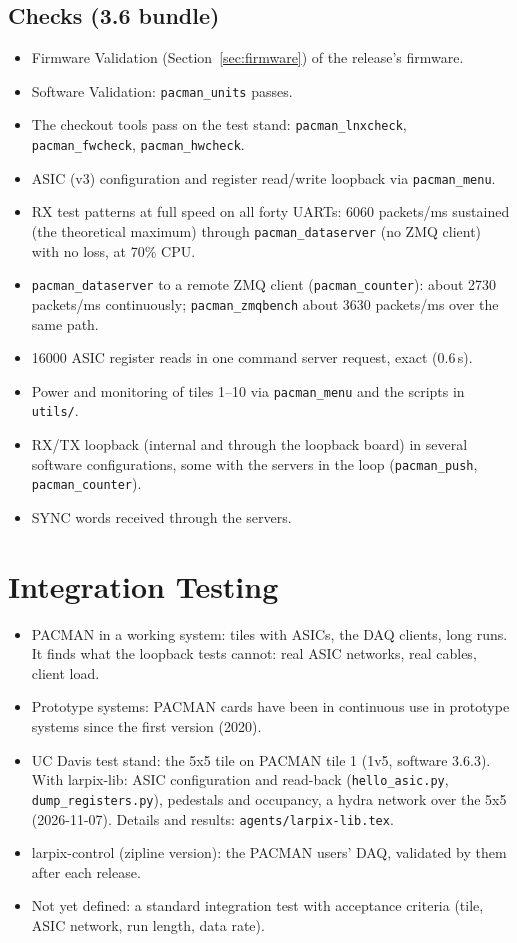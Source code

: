 \documentclass[11pt]{article}
\begin{document}
\subsection{Checks (3.6 bundle)}

\begin{itemize}
\item Firmware Validation (Section~\ref{sec:firmware}) of the release's firmware.
\item Software Validation:  \texttt{pacman\_units} passes.
\item The checkout tools pass on the test stand:  \texttt{pacman\_lnxcheck}, \texttt{pacman\_fwcheck},
  \texttt{pacman\_hwcheck}.
\item ASIC (v3) configuration and register read/write loopback via \texttt{pacman\_menu}.
\item RX test patterns at full speed on all forty UARTs:  6060 packets/ms sustained (the theoretical maximum)
  through \texttt{pacman\_dataserver} (no ZMQ client) with no loss, at 70\% CPU.
\item \texttt{pacman\_dataserver} to a remote ZMQ client (\texttt{pacman\_counter}):  about 2730 packets/ms
  continuously;  \texttt{pacman\_zmqbench} about 3630 packets/ms over the same path.
\item 16000 ASIC register reads in one command server request, exact (0.6\,s).
\item Power and monitoring of tiles 1--10 via \texttt{pacman\_menu} and the scripts in \texttt{utils/}.
\item RX/TX loopback (internal and through the loopback board) in several software configurations, some with
  the servers in the loop (\texttt{pacman\_push}, \texttt{pacman\_counter}).
\item SYNC words received through the servers.
\end{itemize}

\section{Integration Testing}\label{sec:integration}

\begin{itemize}
\item PACMAN in a working system:  tiles with ASICs, the DAQ clients, long runs.  It finds what the loopback tests
  cannot:  real ASIC networks, real cables, client load.
\item Prototype systems:  PACMAN cards have been in continuous use in prototype systems since the first version
  (2020).
\item UC Davis test stand:  the 5x5 tile on PACMAN tile 1 (1v5, software 3.6.3).  With larpix-lib:  ASIC
  configuration and read-back (\texttt{hello\_asic.py}, \texttt{dump\_registers.py}), pedestals and occupancy, a
  hydra network over the 5x5 (2026-11-07).  Details and results:  \texttt{agents/larpix-lib.tex}.
\item larpix-control (zipline version):  the PACMAN users' DAQ, validated by them after each release.
\item Not yet defined:  a standard integration test with acceptance criteria (tile, ASIC network, run length,
  data rate).
\end{itemize}
\end{document}

